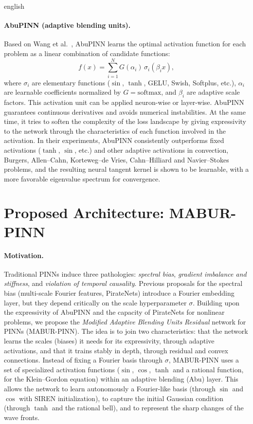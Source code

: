 \documentclass[../0000.tex]{subfiles}
\begin{document}
\begin{hyphenrules}{english}
\paragraph{AbuPINN (adaptive blending units).}
Based on Wang et al.~\cite{wang2023abu}, AbuPINN learns the optimal activation function for each problem as a
linear combination of candidate functions:
\begin{equation}
  f(x)=\sum_{i=1}^{N}G(\alpha_i)\,\sigma_i(\beta_ix),
  \label{eq:abu}
\end{equation}
where $\sigma_i$ are elementary functions ($\sin$, $\tanh$, GELU, Swish, Softplus, etc.), $\alpha_i$ are
learnable coefficients normalized by $G=\mathrm{softmax}$, and $\beta_i$ are adaptive scale factors. This
activation unit can be applied neuron-wise or layer-wise. AbuPINN guarantees continuous derivatives and
avoids numerical instabilities. At the same time, it tries to soften the complexity of the loss landscape
by giving expressivity to the network through the characteristics of each function involved in the
activation. In their experiments, AbuPINN consistently outperforms fixed activations ($\tanh$, $\sin$,
etc.) and other adaptive activations in convection, Burgers, Allen--Cahn, Korteweg--de Vries,
Cahn--Hilliard and Navier--Stokes problems, and the resulting neural tangent kernel is shown to be
learnable, with a more favorable eigenvalue spectrum for convergence.

\section{Proposed Architecture: MABUR-PINN}\label{sec:mabur}

\paragraph{Motivation.}
Traditional PINNs induce three pathologies: \emph{spectral bias}, \emph{gradient imbalance and
stiffness}, and \emph{violation of temporal causality}. Previous proposals for the spectral bias
(multi-scale Fourier features, PirateNets) introduce a Fourier embedding layer, but they depend critically
on the scale hyperparameter $\sigma$. Building upon the expressivity of AbuPINN and the capacity of
PirateNets for nonlinear problems, we propose the \emph{Modified Adaptive Blending Units Residual} network
for PINNs (MABUR-PINN). The idea is to join two characteristics: that the network learns the scales
(biases) it needs for its expressivity, through adaptive activations, and that it trains stably in depth,
through residual and convex connections. Instead of fixing a Fourier basis through $\sigma$, MABUR-PINN
uses a set of specialized activation functions ($\sin$, $\cos$, $\tanh$ and a rational function, for the
Klein--Gordon equation) within an adaptive blending (Abu) layer. This allows the network to learn
autonomously a Fourier-like basis (through $\sin$ and $\cos$ with SIREN initialization), to capture the
initial Gaussian condition (through $\tanh$ and the rational bell), and to represent the sharp changes of
the wave fronts.


\end{hyphenrules}
\end{document}
